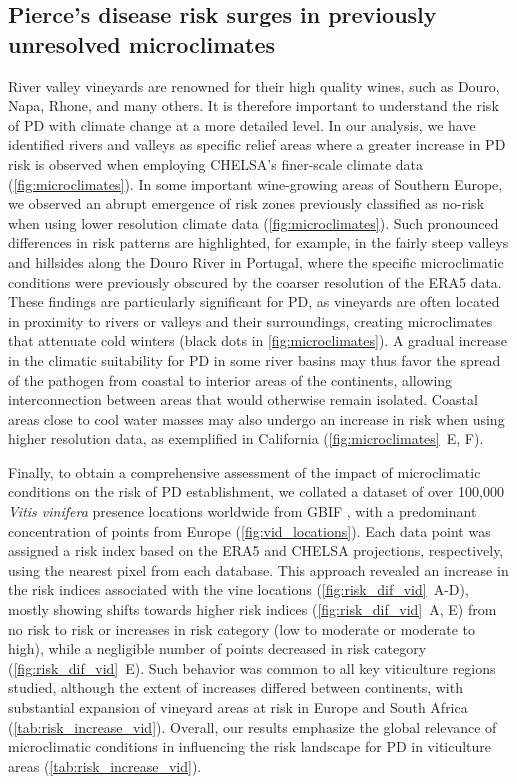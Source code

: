\subsection{Pierce's disease risk surges in previously unresolved
    microclimates}

River valley vineyards are renowned for their high quality wines, such as
Douro, Napa, Rhone, and many others. It is therefore important to understand
the risk of  PD with climate change at a more detailed level. In our analysis,
we have identified rivers and valleys as specific relief areas where a greater
increase in PD risk is observed when employing CHELSA’s finer-scale climate
data (\cref{fig:microclimates}). In some important wine-growing areas of
Southern Europe, we observed an abrupt emergence of risk zones previously
classified as no-risk when using lower resolution climate data
(\cref{fig:microclimates}). Such pronounced differences in risk patterns are
highlighted, for example, in the fairly steep valleys and hillsides along the
Douro River in Portugal, where the specific microclimatic conditions were
previously obscured by the coarser resolution of the ERA5 data. These findings
are particularly significant for PD,  as vineyards are often located in
proximity to rivers or valleys and their surroundings, creating microclimates
that attenuate cold winters (black dots in \cref{fig:microclimates}). A
gradual increase in the climatic suitability for PD in some river basins may
thus favor the spread of the pathogen from coastal  to interior areas of the
continents, allowing interconnection between areas that would otherwise remain
isolated. Coastal areas close to cool water masses may also undergo an increase
in risk  when using higher resolution data, as exemplified in California
(\cref{fig:microclimates}~\textcolor{ref_color}{E, F}).

Finally, to obtain a comprehensive assessment of the impact of
microclimatic conditions on the risk of PD establishment, we collated a dataset
of over 100,000 \textit {Vitis vinifera} presence locations worldwide from GBIF
\cite{GBIF}, with a predominant concentration of points from Europe
(\cref{fig:vid_locations}). Each data point was assigned a risk index
based on the ERA5 and CHELSA projections, respectively, using the nearest pixel
from each database. This approach revealed an increase in the risk indices
associated with the vine locations
(\cref{fig:risk_dif_vid}~\textcolor{ref_color}{A-D}), mostly
showing shifts towards higher risk indices
(\cref{fig:risk_dif_vid}~\textcolor{ref_color}{A, E}) from
no risk to risk or increases in risk category (low to moderate or moderate to
high), while a negligible number of points decreased in risk category
(\cref{fig:risk_dif_vid}~\textcolor{ref_color}{E}). Such behavior was common to
all key viticulture
regions studied, although the extent of increases differed between continents,
with substantial expansion of vineyard areas at risk in Europe and South Africa
(\cref{tab:risk_increase_vid}). Overall, our results emphasize the global
relevance of microclimatic conditions in influencing the risk landscape for PD
in viticulture areas (\cref{tab:risk_increase_vid}).

